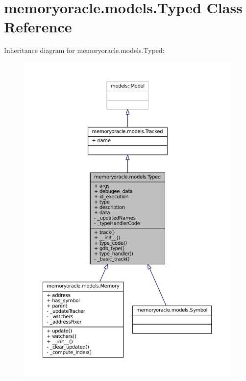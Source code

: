 \hypertarget{classmemoryoracle_1_1models_1_1Typed}{}\section{memoryoracle.\+models.\+Typed Class Reference}
\label{classmemoryoracle_1_1models_1_1Typed}


Inheritance diagram for memoryoracle.\+models.\+Typed\+:\nopagebreak
\begin{figure}[H]
\begin{center}
\leavevmode
\includegraphics[width=350pt]{classmemoryoracle_1_1models_1_1Typed__inherit__graph}
\end{center}
\end{figure}


